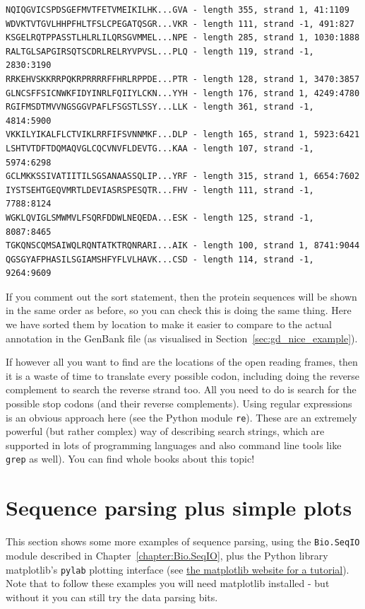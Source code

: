 \documentclass{report}
\begin{document}
\begin{verbatim}
NQIQGVICSPDSGEFMVTFETVMEIKILHK...GVA - length 355, strand 1, 41:1109
WDVKTVTGVLHHPFHLTFSLCPEGATQSGR...VKR - length 111, strand -1, 491:827
KSGELRQTPPASSTLHLRLILQRSGVMMEL...NPE - length 285, strand 1, 1030:1888
RALTGLSAPGIRSQTSCDRLRELRYVPVSL...PLQ - length 119, strand -1, 2830:3190
RRKEHVSKKRRPQKRPRRRRFFHRLRPPDE...PTR - length 128, strand 1, 3470:3857
GLNCSFFSICNWKFIDYINRLFQIIYLCKN...YYH - length 176, strand 1, 4249:4780
RGIFMSDTMVVNGSGGVPAFLFSGSTLSSY...LLK - length 361, strand -1, 4814:5900
VKKILYIKALFLCTVIKLRRFIFSVNNMKF...DLP - length 165, strand 1, 5923:6421
LSHTVTDFTDQMAQVGLCQCVNVFLDEVTG...KAA - length 107, strand -1, 5974:6298
GCLMKKSSIVATIITILSGSANAASSQLIP...YRF - length 315, strand 1, 6654:7602
IYSTSEHTGEQVMRTLDEVIASRSPESQTR...FHV - length 111, strand -1, 7788:8124
WGKLQVIGLSMWMVLFSQRFDDWLNEQEDA...ESK - length 125, strand -1, 8087:8465
TGKQNSCQMSAIWQLRQNTATKTRQNRARI...AIK - length 100, strand 1, 8741:9044
QGSGYAFPHASILSGIAMSHFYFLVLHAVK...CSD - length 114, strand -1, 9264:9609
\end{verbatim}

If you comment out the sort statement, then the protein sequences will be
shown in the same order as before, so you can check this is doing the same
thing.  Here we have sorted them by location to make it easier to compare
to the actual annotation in the GenBank file (as visualised in
Section~\ref{sec:gd_nice_example}).

If however all you want to find are the locations of the open reading frames,
then it is a waste of time to translate every possible codon, including doing
the reverse complement to search the reverse strand too.  All you need to do
is search for the possible stop codons (and their reverse complements).  Using
regular expressions is an obvious approach here (see the Python module
\verb|re|). These are an extremely powerful (but rather complex) way of
describing search strings, which are supported in lots of programming
languages and also command line tools like \texttt{grep} as well). You can
find whole books about this topic!


\section{Sequence parsing plus simple plots}
\label{seq:sequence-parsing-plus-pylab}

This section shows some more examples of sequence parsing, using the \verb|Bio.SeqIO|
module described in Chapter~\ref{chapter:Bio.SeqIO}, plus the Python library matplotlib's \verb|pylab| plotting interface (see \href{http://matplotlib.sourceforge.net/}{the matplotlib website for a tutorial}).  Note that to follow these examples you will need matplotlib installed - but without it you can still try the data parsing bits.
\end{document}
